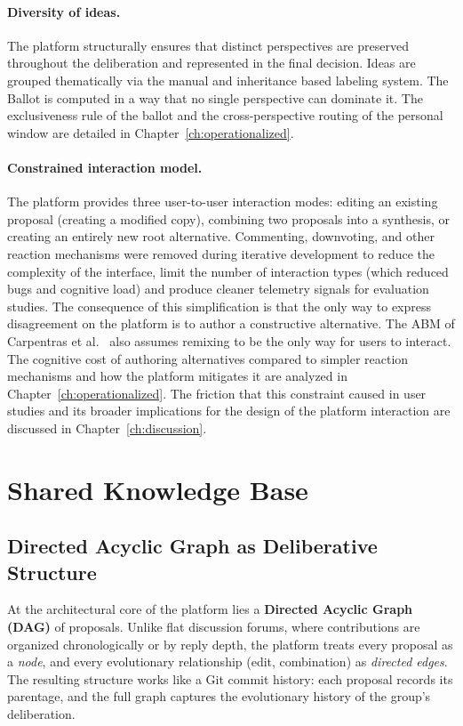 \documentclass[a4paper, 12pt, twoside]{iviathesis}
\begin{document}
\paragraph{Diversity of ideas.}
The platform structurally ensures that distinct perspectives are preserved throughout the deliberation and represented in the final decision. Ideas are grouped thematically via the manual and inheritance based labeling system. The Ballot is computed in a way that no single perspective can dominate it. The exclusiveness rule of the ballot and the cross-perspective routing of the personal window are detailed in Chapter~\ref{ch:operationalized}.

\paragraph{Constrained interaction model.}
\label{sec:positive-only}
The platform provides three user-to-user interaction modes: editing an existing proposal (creating a modified copy), combining two proposals into a synthesis, or creating an entirely new root alternative. Commenting, downvoting, and other reaction mechanisms were removed during iterative development to reduce the complexity of the interface, limit the number of interaction types (which reduced bugs and cognitive load) and produce cleaner telemetry signals for evaluation studies. The consequence of this simplification is that the only way to express disagreement on the platform is to author a constructive alternative. The ABM of Carpentras et al.\ \cite{carpentras_wisdom_2025} also assumes remixing to be the only way for users to interact. The cognitive cost of authoring alternatives compared to simpler reaction mechanisms and how the platform mitigates it are analyzed in Chapter~\ref{ch:operationalized}. The friction that this constraint caused in user studies and its broader implications for the design of the platform interaction are discussed in Chapter~\ref{ch:discussion}.

\section{Shared Knowledge Base}

\subsection{Directed Acyclic Graph as Deliberative Structure}
\label{sec:dag-structure}

At the architectural core of the platform lies a \textbf{Directed Acyclic Graph (DAG)} of proposals. Unlike flat discussion forums, where contributions are organized chronologically or by reply depth, the platform treats every proposal as a \textit{node}, and every evolutionary relationship (edit, combination) as \textit{directed edges}. The resulting structure works like a Git commit history: each proposal records its parentage, and the full graph captures the evolutionary history of the group's deliberation.
\end{document}
